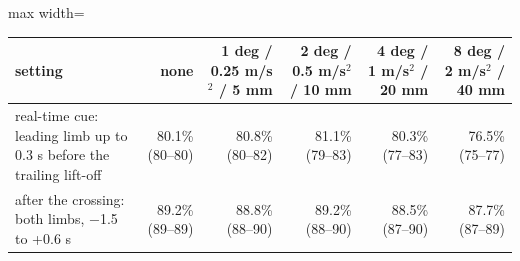 \begin{adjustbox}{max width=\textwidth}
{\scriptsize
\begin{tabular}{p{3.4cm}rrrrr}
\toprule
\textbf{setting} & \textbf{none} & \textbf{1 deg / 0.25 m/s$^2$ / 5 mm} & \textbf{2 deg / 0.5 m/s$^2$ / 10 mm} & \textbf{4 deg / 1 m/s$^2$ / 20 mm} & \textbf{8 deg / 2 m/s$^2$ / 40 mm} \\
\midrule
real-time cue: leading limb up to 0.3 s before the trailing lift-off & 80.1\% (80--80) & 80.8\% (80--82) & 81.1\% (79--83) & 80.3\% (77--83) & 76.5\% (75--77) \\
after the crossing: both limbs, $-$1.5 to +0.6 s & 89.2\% (89--89) & 88.8\% (88--90) & 89.2\% (88--90) & 88.5\% (87--90) & 87.7\% (87--89) \\
\bottomrule
\end{tabular}
}
\end{adjustbox}
